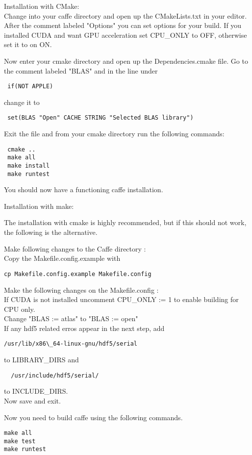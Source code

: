 \documentclass[main.tex]{subfiles}
\begin{document}
 Installation with CMake:\\
 
 Change into your caffe directory and open up the CMakeLists.txt in your editor. After the comment labeled "Options" you can set options for your build. If you installed CUDA and want GPU acceleration set CPU\_ONLY to OFF, otherwise set it to on ON.
 
 Now enter your cmake directory and open up the Dependencies.cmake file. Go to the comment labeled "BLAS" and in the line under 
 
 \begin{lstlisting}
 if(NOT APPLE)
\end{lstlisting}
 
 change it to 
 
 \begin{lstlisting}
 set(BLAS "Open" CACHE STRING "Selected BLAS library")
\end{lstlisting}
 
 Exit the file and from your cmake directory run the following commands:
 \begin{lstlisting}
 cmake ..
 make all
 make install
 make runtest
\end{lstlisting}
 You should now have a functioning caffe installation.

\newpage
 
 
 
 
Installation with make:

The installation with cmake is highly recommended, but if this should not work, the following is the alternative.

 Make following changes to the Caffe directory : \\

Copy the Makefile.config.example with 
\begin{lstlisting}
cp Makefile.config.example Makefile.config
\end{lstlisting}
Make the following changes on the Makefile.config :\\

If CUDA is not installed uncomment CPU\_ONLY := 1 to enable building for CPU only.\\
Change "BLAS := atlas" to "BLAS := open"\\
If any hdf5 related erros appear in the next step, add 
\begin{lstlisting}
/usr/lib/x86\_64-linux-gnu/hdf5/serial
\end{lstlisting}
 to LIBRARY\_DIRS and
\begin{lstlisting} 
  /usr/include/hdf5/serial/ 
\end{lstlisting} 
  to INCLUDE\_DIRS.\\
Now save and exit.

 	
Now you need to build caffe using the following commands.
\begin{lstlisting}
make all
make test
make runtest  
\end{lstlisting}

 
\end{document}
